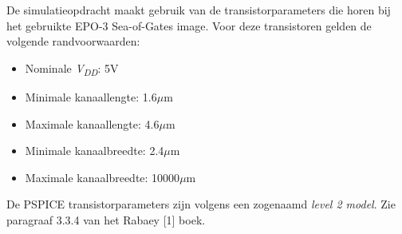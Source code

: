 


De simulatieopdracht maakt gebruik van de transistorparameters die horen bij het gebruikte EPO-3 Sea-of-Gates image. Voor deze transistoren gelden de volgende randvoorwaarden:
\begin{itemize}
\item{Nominale \emph{V\textsubscript{DD}}:		5V}
\item{Minimale kanaallengte:		1.6$\mu$m}
\item{Maximale kanaallengte:		4.6$\mu$m}
\item{Minimale kanaalbreedte:		2.4$\mu$m}
\item{Maximale kanaalbreedte:		10000$\mu$m}
\end{itemize}
De PSPICE transistorparameters zijn volgens een zogenaamd \emph{level 2 model}. Zie paragraaf 3.3.4 van het Rabaey [1] boek.




